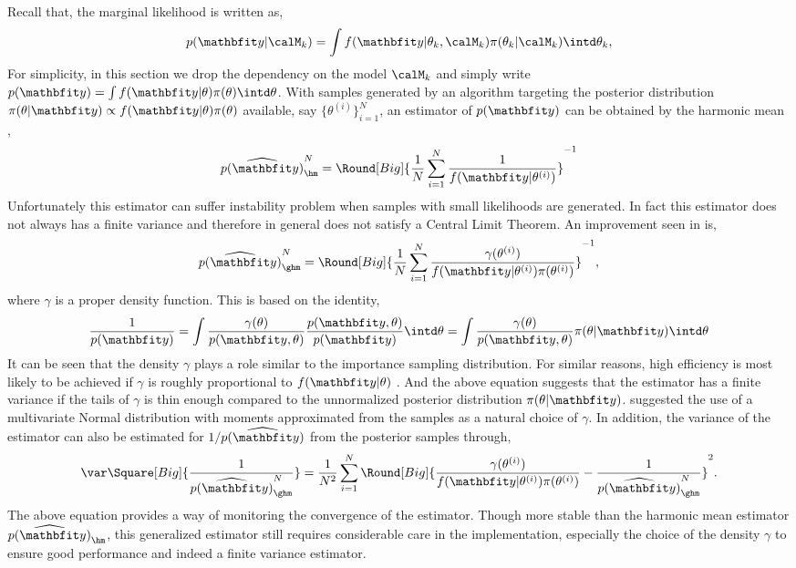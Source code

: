 Recall that, the marginal likelihood is written as,
\begin{equation*}
  p(\data|\calM_k) = \int
  f(\data|\theta_k,\calM_k)\pi(\theta_k|\calM_k)\intd\theta_k,
\end{equation*}
For simplicity, in this section we drop the dependency on the model $\calM_k$
and simply write $p(\data) = \int f(\data|\theta)\pi(\theta)\intd\theta$.
With samples generated by an \mcmc algorithm targeting the posterior
distribution $\pi(\theta|\data) \propto f(\data|\theta) \pi(\theta)$
available, say $\{\theta^{(i)}\}_{i=1}^N$, an estimator of $p(\data)$ can be
obtained by the harmonic mean \cite{Newton:1994wm},
\begin{equation}
  \widehat{p(\data)}_{\hm}^N =
  \Round[Big]{\frac{1}{N}\sum_{i=1}^N\frac{1}{f(\data|\theta^{(i)})}}^{-1}
\end{equation}
Unfortunately this estimator can suffer instability problem when samples with
small likelihoods are generated. In fact this estimator does not always has a
finite variance and therefore in general does not satisfy a Central Limit
Theorem. An improvement seen in \cite{Kass:1995vb} is,
\begin{equation}
  \widehat{p(\data)}_{\ghm}^N = \Round[Big]{
    \frac{1}{N}\sum_{i=1}^N
    \frac{\gamma(\theta^{(i)})}{f(\data|\theta^{(i)})\pi(\theta^{(i)})}}^{-1},
\end{equation}
where $\gamma$ is a proper density function. This is based on the identity,
\begin{equation}
  \frac{1}{p(\data)}
  = \int \frac{\gamma(\theta)}{p(\data,\theta)}
  \frac{p(\data,\theta)}{p(\data)} \intd \theta
  = \int \frac{\gamma(\theta)}{p(\data,\theta)} \pi(\theta|\data) \intd \theta
\end{equation}
It can be seen that the density $\gamma$ plays a role similar to the
importance sampling distribution. For similar reasons, high efficiency is most
likely to be achieved if $\gamma$ is roughly proportional to $f(\data|\theta)$
\cite{Kass:1995vb}. And the above equation suggests that the estimator has a
finite variance if the tails of $\gamma$ is thin enough compared to the
unnormalized posterior distribution $\pi(\theta|\data)$.
\cite{Gelfand:1994ux} suggested the use of a multivariate Normal distribution
with moments approximated from the samples as a natural choice of $\gamma$. In
addition, the variance of the estimator can also be estimated for
$1/\widehat{p(\data)}$ from the posterior samples through,
\begin{equation}
  \var\Square[Big]{\frac{1}{\widehat{p(\data)}_{\ghm}^N}} =
  \frac{1}{N^2}\sum_{i=1}^N \Round[Big]{
    \frac{\gamma(\theta^{(i)})}{f(\data|\theta^{(i)})\pi(\theta^{(i)})}
    - \frac{1}{\widehat{p(\data)}_{\ghm}^N}}^2.
\end{equation}
The above equation provides a way of monitoring the convergence of the
estimator. Though more stable than the harmonic mean estimator
$\widehat{p(\data)}_{\hm}$, this generalized estimator still requires
considerable care in the implementation, especially the choice of the density
$\gamma$ to ensure good performance and indeed a finite variance estimator.

